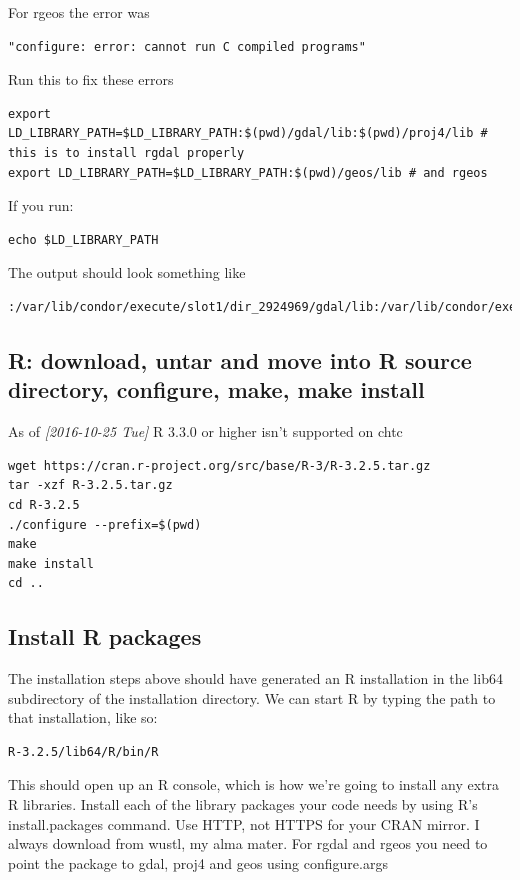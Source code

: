 \documentclass{article}
\begin{document}
For rgeos the error was
\begin{verbatim}
"configure: error: cannot run C compiled programs"
\end{verbatim}

Run this to fix these errors
\begin{verbatim}
export LD_LIBRARY_PATH=$LD_LIBRARY_PATH:$(pwd)/gdal/lib:$(pwd)/proj4/lib # this is to install rgdal properly
export LD_LIBRARY_PATH=$LD_LIBRARY_PATH:$(pwd)/geos/lib # and rgeos
\end{verbatim}

If you run:
\begin{verbatim}
echo $LD_LIBRARY_PATH
\end{verbatim}
The output should look something like
\begin{verbatim}
:/var/lib/condor/execute/slot1/dir_2924969/gdal/lib:/var/lib/condor/execute/slot1/dir_2924969/proj4/lib:/var/lib/condor/execute/slot1/dir_2924969/geos/lib
\end{verbatim}


\subsection*{R: download, untar and move into R source directory, configure, make, make install}
\label{sec:org014a289}
As of \textit{[2016-10-25 Tue] } R 3.3.0 or higher isn't supported on chtc
\begin{verbatim}
wget https://cran.r-project.org/src/base/R-3/R-3.2.5.tar.gz
tar -xzf R-3.2.5.tar.gz
cd R-3.2.5
./configure --prefix=$(pwd)
make
make install
cd ..
\end{verbatim}

\subsection*{Install R packages}
\label{sec:orgaab4227}

The installation steps above should have generated an R installation
in the lib64 subdirectory of the installation directory. We can start
R by typing the path to that installation, like so:

\begin{verbatim}
R-3.2.5/lib64/R/bin/R
\end{verbatim}

This should open up an R console, which is how we're going to install
any extra R libraries. Install each of the library packages your code
needs by using R's install.packages command.  Use HTTP, not HTTPS for
your CRAN mirror.  I always download from wustl, my alma mater.  For rgdal and rgeos you need to
point the package to gdal, proj4 and geos using configure.args
\end{document}
